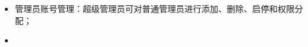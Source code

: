 \subsubsection{}

\begin{itemize}
    \item 管理员账号管理：超级管理员可对普通管理员进行添加、删除、启停和权限分配；
    \item {}
\end{itemize}
